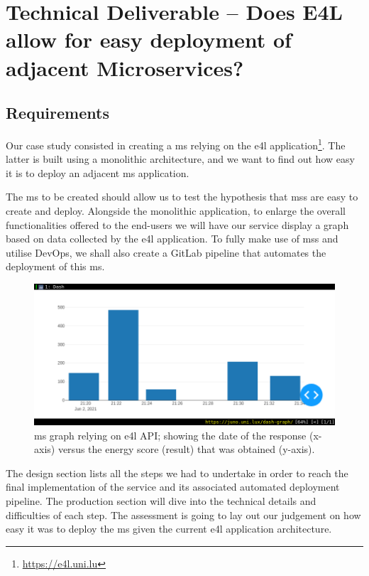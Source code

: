 \section{Technical Deliverable -- Does E4L allow for easy
deployment of adjacent Microservices?}
\label{td:ms}

\subsection{Requirements}

Our case study consisted in creating a \gls{ms} relying on the
\gls{e4l} application\footnote{\url{https://e4l.uni.lu}}. The latter is built using a monolithic
architecture, and we want to find out how easy it is to deploy an
adjacent \gls{ms} application.

The \gls{ms} to be created should allow us to test the hypothesis that
\glspl{ms} are easy to create and deploy. Alongside the monolithic
application, to enlarge the overall functionalities offered to the
end-users we will have our service display a graph
based on data collected by the \gls{e4l} application. To fully make
use of \glspl{ms} and utilise DevOps, we shall also create a GitLab pipeline that automates
the deployment of this \gls{ms}.

\begin{figure}
	\centering
	\includegraphics[width=\linewidth]{images/dash-API-demo.png}
	\caption{\gls{ms} graph relying on \gls{e4l} API; showing the date
	of the response (x-axis) versus the energy score (result) that was
	obtained (y-axis).}
	\label{fig:dash-api}
\end{figure}

The design section lists all the steps we had to
undertake in order to reach the final implementation of the service
and its associated automated deployment
pipeline. The production section will dive into the technical details
and difficulties of each step. The assessment is going to lay out our
judgement on how easy it was to deploy the \gls{ms} given the current
\gls{e4l} application architecture.


